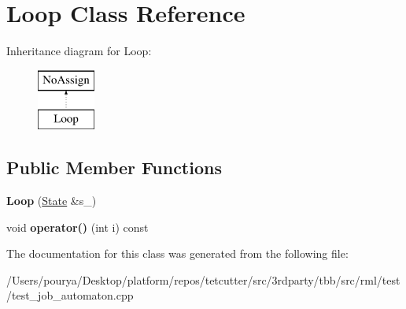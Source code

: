 \hypertarget{classLoop}{}\section{Loop Class Reference}
\label{classLoop}
Inheritance diagram for Loop\+:\begin{figure}[H]
\begin{center}
\leavevmode
\includegraphics[height=2.000000cm]{classLoop}
\end{center}
\end{figure}
\subsection*{Public Member Functions}
\begin{DoxyCompactItemize}
\item 
\hypertarget{classLoop_a3a7be939e29623031f5123baa2683f04}{}{\bfseries Loop} (\hyperlink{structState}{State} \&s\+\_\+)\label{classLoop_a3a7be939e29623031f5123baa2683f04}

\item 
\hypertarget{classLoop_ad271f6c1bca42d248f8b65f8190bde35}{}void {\bfseries operator()} (int i) const \label{classLoop_ad271f6c1bca42d248f8b65f8190bde35}

\end{DoxyCompactItemize}


The documentation for this class was generated from the following file\+:\begin{DoxyCompactItemize}
\item 
/\+Users/pourya/\+Desktop/platform/repos/tetcutter/src/3rdparty/tbb/src/rml/test/test\+\_\+job\+\_\+automaton.\+cpp\end{DoxyCompactItemize}
